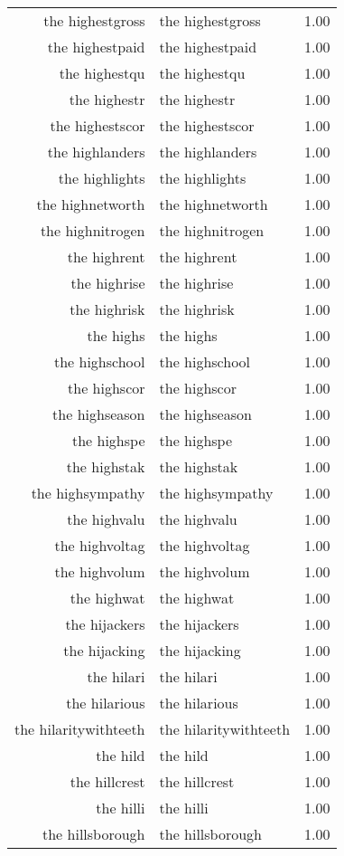 \begin{table}[ht]
\begin{tabular}{rlr}
  the highestgross & the highestgross & 1.00 \\ 
  the highestpaid & the highestpaid & 1.00 \\ 
  the highestqu & the highestqu & 1.00 \\ 
  the highestr & the highestr & 1.00 \\ 
  the highestscor & the highestscor & 1.00 \\ 
  the highlanders & the highlanders & 1.00 \\ 
  the highlights & the highlights & 1.00 \\ 
  the highnetworth & the highnetworth & 1.00 \\ 
  the highnitrogen & the highnitrogen & 1.00 \\ 
  the highrent & the highrent & 1.00 \\ 
  the highrise & the highrise & 1.00 \\ 
  the highrisk & the highrisk & 1.00 \\ 
  the highs & the highs & 1.00 \\ 
  the highschool & the highschool & 1.00 \\ 
  the highscor & the highscor & 1.00 \\ 
  the highseason & the highseason & 1.00 \\ 
  the highspe & the highspe & 1.00 \\ 
  the highstak & the highstak & 1.00 \\ 
  the highsympathy & the highsympathy & 1.00 \\ 
  the highvalu & the highvalu & 1.00 \\ 
  the highvoltag & the highvoltag & 1.00 \\ 
  the highvolum & the highvolum & 1.00 \\ 
  the highwat & the highwat & 1.00 \\ 
  the hijackers & the hijackers & 1.00 \\ 
  the hijacking & the hijacking & 1.00 \\ 
  the hilari & the hilari & 1.00 \\ 
  the hilarious & the hilarious & 1.00 \\ 
  the hilaritywithteeth & the hilaritywithteeth & 1.00 \\ 
  the hild & the hild & 1.00 \\ 
  the hillcrest & the hillcrest & 1.00 \\ 
  the hilli & the hilli & 1.00 \\ 
  the hillsborough & the hillsborough & 1.00 \\ 

\end{tabular}
\end{table}
